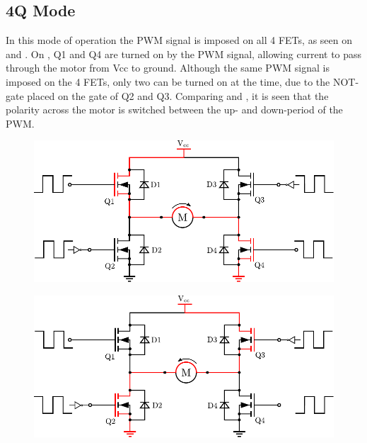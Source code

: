 \subsection{4Q Mode}
In this mode of operation the PWM signal is imposed on all 4 FETs, as seen on  and . On , Q1 and Q4 are turned on by the PWM signal, allowing current to pass through the motor from Vcc to ground. Although the same PWM signal is imposed on the 4 FETs, only two can be turned on at the time, due to the NOT-gate placed on the gate of Q2 and Q3. Comparing  and , it is seen that the polarity across the motor is switched between the up- and down-period of the PWM.\cite{PAndersen}

  \begin{minipage}{\linewidth}
  	\begin{minipage}{0.45\linewidth}
  		\begin{figure}[H]
  			\includegraphics[scale=.53]{figures/HbridgeClockwise4Q.pdf}
  			\centering
  			\vspace{-.4cm}
  			\captionsetup{justification=centering}
  			\label{HbridgeClokwise4Q}
  		\end{figure}\vspace{-5mm}
  	\end{minipage}
  	\hspace{0.03\linewidth}
  	\begin{minipage}{0.45\linewidth}
  		\begin{figure}[H]
  			\includegraphics[scale=.53]{figures/HbridgeCounterClockwise4Q.pdf}

\end{figure}
\end{minipage}
\end{minipage}
